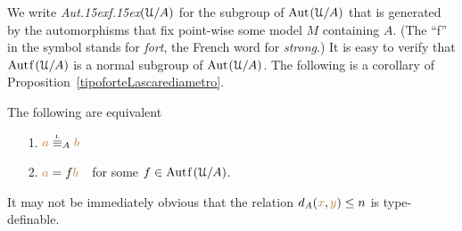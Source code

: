 We write \emph{Aut\kern.15ex{f}\kern.15ex$(\EuScript U/A)$\/} for the subgroup of ${\rm Aut\kern.15ex}(\EuScript U/A)$ that is generated by the automorphisms that fix point-wise some model $M$ containing $A$.
(The ``f'' in the symbol stands for \textit{fort\/}, the French word for \textit{strong}.) It is easy to verify that $\mathord{\rm Aut\kern.15ex{f}\kern.15ex}(\EuScript U/A)$ is a normal subgroup of ${\rm Aut\kern.15ex}(\EuScript U/A)$.
The following is a corollary of Proposition~\ref{tipoforteLascarediametro}. 

\begin{corollary}
The following are equivalent
\begin{itemize}
 \item[1.] ${\mr a}\equivL_A{\mr b}$
 \item[2.] ${\color{brown} a}=f{\color{brown} b}$\ \ for some $f\in\mathord{\rm Aut\kern.15ex{f}\kern.15ex}(\EuScript U/A)$.
\end{itemize}
\end{corollary}

% 

It may not be immediately obvious that the relation $d_A({\color{brown} x},{\color{brown} y})\le n$ is type-definable.

